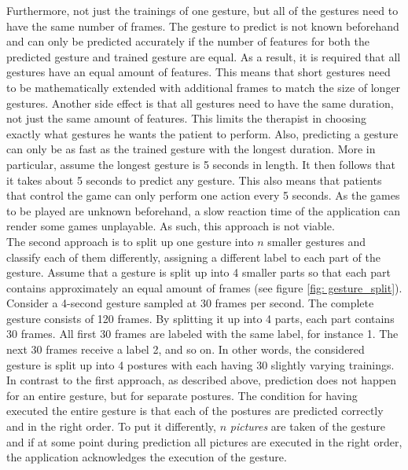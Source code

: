 Furthermore, not just the trainings of one gesture, but all of the gestures need to have the same number of frames. The gesture to predict is not known beforehand and can only be predicted accurately if the number of features for both the predicted gesture and trained gesture are equal. As a result, it is required that all gestures have an equal amount of features. This means that short gestures need to be mathematically extended with additional frames to match the size of longer gestures. Another side effect is that all gestures need to have the same duration, not just the same amount of features. This limits the therapist in choosing exactly what gestures he wants the patient to perform. Also, predicting a gesture can only be as fast as the trained gesture with the longest duration. More in particular, assume the longest gesture is 5 seconds in length. It then follows that it takes about 5 seconds to predict any gesture. This also means that patients that control the game can only perform one action every 5 seconds. As the games to be played are unknown beforehand, a slow reaction time of the application can render some games unplayable. As such, this approach is not viable.\\

The second approach is to split up one gesture into $n$ smaller gestures and classify each of them differently, assigning a different label to each part of the gesture. Assume that a gesture is split up into 4 smaller parts so that each part contains approximately an equal amount of frames (see figure \ref{fig: gesture_split}). Consider a 4-second gesture sampled at 30 frames per second. The complete gesture consists of 120 frames. By splitting it up into 4 parts, each part contains 30 frames. All first 30 frames are labeled with the same label, for instance 1. The next 30 frames receive a label 2, and so on. In other words, the considered gesture is split up into 4 postures with each having 30 slightly varying trainings. In contrast to the first approach, as described above, prediction does not happen for an entire gesture, but for separate postures. The condition for having executed the entire gesture is that each of the postures are predicted correctly and in the right order. To put it differently, $n$ \emph{pictures} are taken of the gesture and if at some point during prediction all pictures are executed in the right order, the application acknowledges the execution of the gesture.\\

